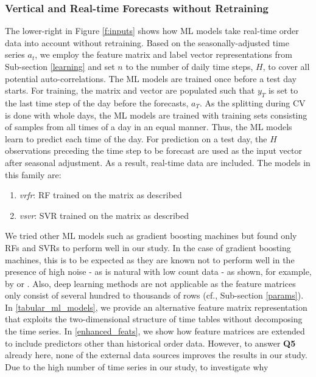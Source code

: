 \subsubsection{Vertical and Real-time Forecasts without Retraining}
\label{ml_models}

The lower-right in Figure \ref{f:inputs} shows how ML models take
    real-time order data into account without retraining.
Based on the seasonally-adjusted time series $a_t$, we employ the feature
    matrix and label vector representations from Sub-section \ref{learning}
    and set $n$ to the number of daily time steps, $H$, to cover all potential
    auto-correlations.
The ML models are trained once before a test day starts.
For training, the matrix and vector are populated such that $y_T$ is set to
    the last time step of the day before the forecasts, $a_T$.
As the splitting during CV is done with whole days, the ML models are
    trained with training sets consisting of samples from all times of a day
    in an equal manner.
Thus, the ML models learn to predict each time of the day.
For prediction on a test day, the $H$ observations preceding the time
    step to be forecast are used as the input vector after seasonal
    adjustment.
As a result, real-time data are included.
The models in this family are:
\begin{enumerate}
\item \textit{vrfr}: RF trained on the matrix as described
\item \textit{vsvr}: SVR trained on the matrix as described
\end{enumerate}
We tried other ML models such as gradient boosting machines but found
    only RFs and SVRs to perform well in our study.
In the case of gradient boosting machines, this is to be expected as they are
    known not to perform well in the presence of high noise - as is natural
    with low count data - as shown, for example, by \cite{ma2018} or
    \cite{mason2000}.
Also, deep learning methods are not applicable as the feature matrices only
    consist of several hundred to thousands of rows (cf., Sub-section
    \ref{params}).
In \ref{tabular_ml_models}, we provide an alternative feature matrix
    representation that exploits the two-dimensional structure of time tables
    without decomposing the time series.
In \ref{enhanced_feats}, we show how feature matrices are extended
    to include predictors other than historical order data.
However, to answer \textbf{Q5} already here, none of the external data sources
    improves the results in our study.
Due to the high number of time series in our study, to investigate why
